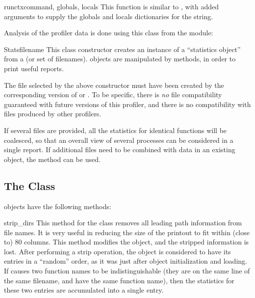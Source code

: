 \begin{funcdesc}{runctx}{command, globals, locals}
This function is similar to , with added
arguments to supply the globals and locals dictionaries for the
 string.
\end{funcdesc}

Analysis of the profiler data is done using this class from the
 module:


\begin{classdesc}{Stats}{filename\optional{, \moreargs}}
This class constructor creates an instance of a ``statistics object''
from a  (or set of filenames).   objects are
manipulated by methods, in order to print useful reports.

The file selected by the above constructor must have been created by
the corresponding version of  or .
To be specific, there is
\emph{no} file compatibility guaranteed with future versions of this
profiler, and there is no compatibility with files produced by other
profilers.

If several files are provided, all the statistics for identical
functions will be coalesced, so that an overall view of several
processes can be considered in a single report.  If additional files
need to be combined with data in an existing  object, the
 method can be used.
\end{classdesc}


\subsection{The  Class \label{profile-stats}}

 objects have the following methods:

\begin{methoddesc}[Stats]{strip_dirs}{}
This method for the  class removes all leading path
information from file names.  It is very useful in reducing the size
of the printout to fit within (close to) 80 columns.  This method
modifies the object, and the stripped information is lost.  After
performing a strip operation, the object is considered to have its
entries in a ``random'' order, as it was just after object
initialization and loading.  If  causes two
function names to be indistinguishable (they are on the same
line of the same filename, and have the same function name), then the
statistics for these two entries are accumulated into a single entry.
\end{methoddesc}


